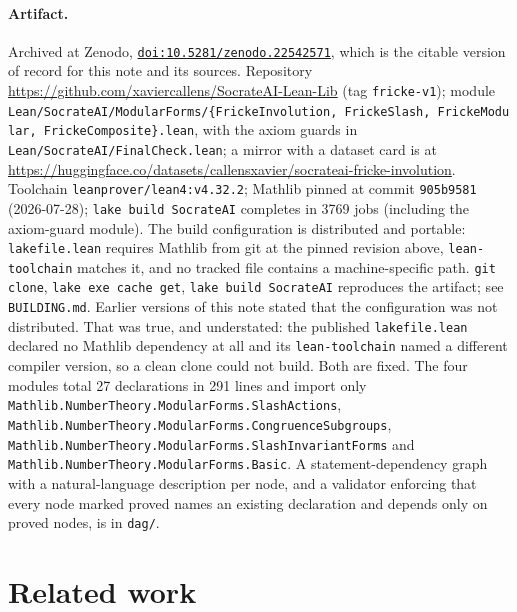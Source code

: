 \documentclass[11pt, a4paper]{article}
\newcommand{\brk}{\discretionary{}{}{}}
\theoremstyle{remark}
\begin{document}
\paragraph{Artifact.}
Archived at Zenodo, \href{https://doi.org/10.5281/zenodo.22542571}{\texttt{doi:10.5281/zenodo.22542571}},
which is the citable version of record for this note and its sources.
Repository \url{https://github.com/xaviercallens/SocrateAI-Lean-Lib} (tag
\texttt{fricke-v1}); module
\texttt{Lean/\brk SocrateAI/\brk ModularForms/\brk \{FrickeInvolution,\brk\ FrickeSlash,\brk\ FrickeModular,\brk\ FrickeComposite\}.lean},
with the axiom guards in \texttt{Lean/\brk SocrateAI/\brk FinalCheck.lean};
a mirror with a dataset card is at
\url{https://huggingface.co/datasets/callensxavier/socrateai-fricke-involution}.
Toolchain \texttt{leanprover/lean4:v4.32.2};
Mathlib pinned at commit \texttt{905b9581} (2026-07-28);
\texttt{lake build SocrateAI} completes in 3769 jobs (including the axiom-guard module).
The build configuration is distributed and portable: \texttt{lakefile.lean} requires Mathlib from
git at the pinned revision above, \texttt{lean-toolchain} matches it, and no tracked file contains a
machine-specific path. \texttt{git clone}, \texttt{lake exe cache get}, \texttt{lake build SocrateAI}
reproduces the artifact; see \texttt{BUILDING.md}. Earlier versions of this note stated that the
configuration was not distributed. That was true, and understated: the published
\texttt{lakefile.lean} declared no Mathlib dependency at all and its \texttt{lean-toolchain} named a
different compiler version, so a clean clone could not build. Both are fixed.
The four modules total 27 declarations in 291 lines and import only
\texttt{Mathlib.\allowbreak NumberTheory.\allowbreak ModularForms.\allowbreak SlashActions},
\texttt{Mathlib.\allowbreak NumberTheory.\allowbreak ModularForms.\allowbreak CongruenceSubgroups},
\texttt{Mathlib.\allowbreak NumberTheory.\allowbreak ModularForms.\allowbreak SlashInvariantForms} and
\texttt{Mathlib.\allowbreak NumberTheory.\allowbreak ModularForms.\allowbreak Basic}.
A statement-dependency graph with a natural-language description per node, and a validator
enforcing that every node marked proved names an existing declaration and depends only on
proved nodes, is in \texttt{dag/}.

\section{Related work}\label{sec:related}
\end{document}
